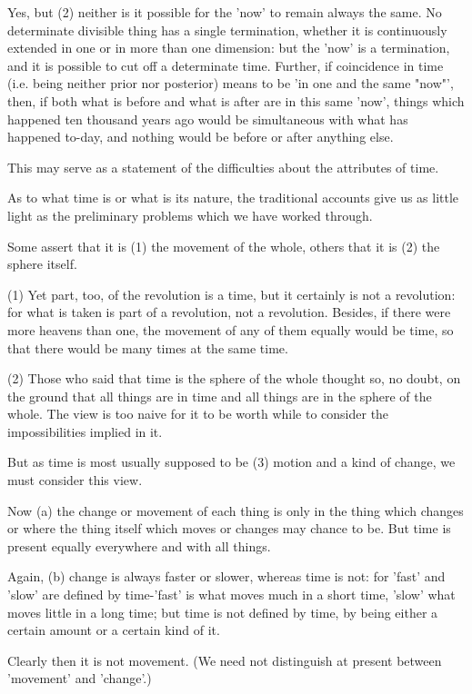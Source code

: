 Yes, but (2) neither is it possible for the 'now' to remain always
the same. No determinate divisible thing has a single termination,
whether it is continuously extended in one or in more than one dimension:
but the 'now' is a termination, and it is possible to cut off a determinate
time. Further, if coincidence in time (i.e. being neither prior nor
posterior) means to be 'in one and the same "now"', then, if both
what is before and what is after are in this same 'now', things which
happened ten thousand years ago would be simultaneous with what has
happened to-day, and nothing would be before or after anything else.

This may serve as a statement of the difficulties about the attributes
of time. 

As to what time is or what is its nature, the traditional accounts
give us as little light as the preliminary problems which we have
worked through. 

Some assert that it is (1) the movement of the whole, others that
it is (2) the sphere itself. 

(1) Yet part, too, of the revolution is a time, but it certainly is
not a revolution: for what is taken is part of a revolution, not a
revolution. Besides, if there were more heavens than one, the movement
of any of them equally would be time, so that there would be many
times at the same time. 

(2) Those who said that time is the sphere of the whole thought so,
no doubt, on the ground that all things are in time and all things
are in the sphere of the whole. The view is too naive for it to be
worth while to consider the impossibilities implied in it.

But as time is most usually supposed to be (3) motion and a kind of
change, we must consider this view. 

Now (a) the change or movement of each thing is only in the thing
which changes or where the thing itself which moves or changes may
chance to be. But time is present equally everywhere and with all
things. 

Again, (b) change is always faster or slower, whereas time is not:
for 'fast' and 'slow' are defined by time-'fast' is what moves much
in a short time, 'slow' what moves little in a long time; but time
is not defined by time, by being either a certain amount or a certain
kind of it. 

Clearly then it is not movement. (We need not distinguish at present
between 'movement' and 'change'.) 

